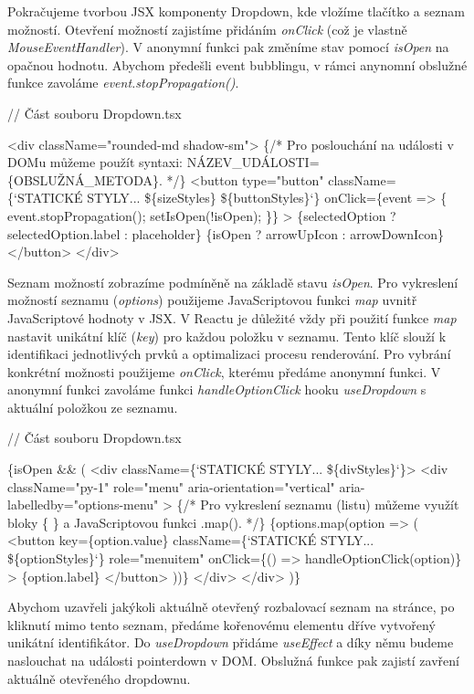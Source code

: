 Pokračujeme tvorbou JSX komponenty Dropdown, kde vložíme tlačítko a seznam možností. Otevření možností zajistíme přidáním \emph{onClick} (což je vlastně \emph{MouseEventHandler}). 
V anonymní funkci pak změníme stav pomocí \emph{isOpen} na opačnou hodnotu. Abychom předešli event bubblingu, v rámci anynomní obslužné funkce zavoláme \emph{event.stopPropagation()}.

\begin{prog}
// Část souboru Dropdown.tsx

<div className="rounded-md shadow-sm">
  \{/* Pro poslouchání na události v DOMu můžeme použít syntaxi: 
    NÁZEV_UDÁLOSTI=\{OBSLUŽNÁ_METODA\}. */\}
  <button
    type="button"
    className=\{`STATICKÉ STYLY... \$\{sizeStyles\} \$\{buttonStyles\}`\}
    onClick=\{event => \{
      event.stopPropagation();
      setIsOpen(!isOpen);
    \}\}
  >
    \{selectedOption ? selectedOption.label : placeholder\}
    \{isOpen ? arrowUpIcon : arrowDownIcon\}
  </button>
</div>
\end{prog}

Seznam možností zobrazíme podmíněně na základě stavu \emph{isOpen}. Pro vykreslení možností seznamu (\emph{options}) použijeme JavaScriptovou funkci \emph{map} uvnitř JavaScriptové hodnoty v JSX. 
V Reactu je důležité vždy při použití funkce \emph{map} nastavit unikátní klíč (\emph{key}) pro každou položku v seznamu. Tento klíč slouží k identifikaci jednotlivých prvků a optimalizaci procesu renderování. 
Pro vybrání konkrétní možnosti použijeme \emph{onClick}, kterému předáme anonymní funkci. V anonymní funkci zavoláme funkci \emph{handleOptionClick} hooku \emph{useDropdown} s aktuální položkou ze seznamu.

\begin{prog}
// Část souboru Dropdown.tsx

\{isOpen && (
  <div className=\{`STATICKÉ STYLY... \$\{divStyles\}`\}>
    <div
      className="py-1"
      role="menu"
      aria-orientation="vertical"
      aria-labelledby="options-menu"
    >
      \{/* Pro vykreslení seznamu (listu) můžeme využít bloky \{ \}
       a JavaScriptovou funkci .map(). */\}
      \{options.map(option => (
        <button
          key=\{option.value\}
          className=\{`STATICKÉ STYLY... \$\{optionStyles\}`\}
          role="menuitem"
          onClick=\{() => handleOptionClick(option)\}
        >
          \{option.label\}
        </button>
      ))\}
    </div>
  </div>
)\}
\end{prog}

Abychom uzavřeli jakýkoli aktuálně otevřený rozbalovací seznam na stránce, po kliknutí mimo tento seznam, předáme kořenovému elementu dříve vytvořený unikátní identifikátor. 
Do \emph{useDropdown} přidáme \emph{useEffect} a díky němu budeme naslouchat na události pointerdown v DOM. Obslužná funkce pak zajistí zavření aktuálně otevřeného dropdownu.

